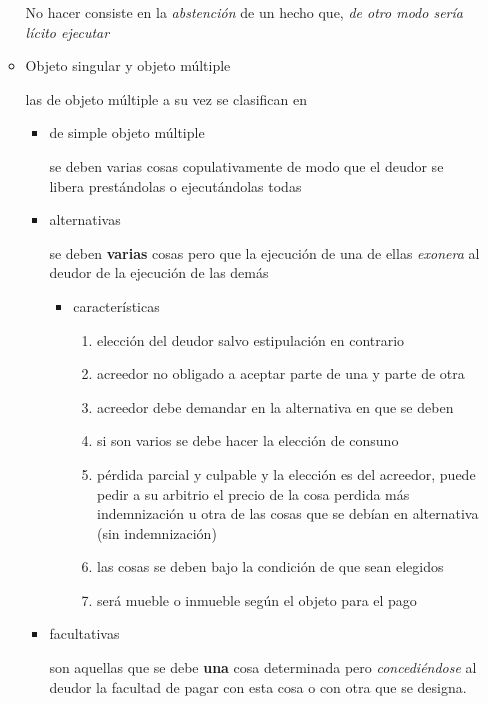 \documentclass[]{article}
\providecommand{\tightlist}{%
  \setlength{\itemsep}{0pt}\setlength{\parskip}{0pt}}
\begin{document}
\begin{itemize}
\begin{itemize}
    No hacer consiste en la \emph{abstención} de un hecho que, \emph{de
    otro modo sería lícito ejecutar}
  \item
    Objeto singular y objeto múltiple

    las de objeto múltiple a su vez se clasifican en

    \begin{itemize}
    \item
      de simple objeto múltiple

      se deben varias cosas copulativamente de modo que el deudor se
      libera prestándolas o ejecutándolas todas
    \item
      alternativas

      se deben \textbf{varias} cosas pero que la ejecución de una de
      ellas \emph{exonera} al deudor de la ejecución de las demás

      \begin{itemize}
      \tightlist
      \item
        características

        \begin{enumerate}
        \def\labelenumi{\arabic{enumi}.}
        \tightlist
        \item
          elección del deudor salvo estipulación en contrario
        \item
          acreedor no obligado a aceptar parte de una y parte de otra
        \item
          acreedor debe demandar en la alternativa en que se deben
        \item
          si son varios se debe hacer la elección de consuno
        \item
          pérdida parcial y culpable y la elección es del acreedor,
          puede pedir a su arbitrio el precio de la cosa perdida más
          indemnización u otra de las cosas que se debían en alternativa
          (sin indemnización)
        \item
          las cosas se deben bajo la condición de que sean elegidos
        \item
          será mueble o inmueble según el objeto para el pago
        \end{enumerate}
      \end{itemize}
    \item
      facultativas

      son aquellas que se debe \textbf{una} cosa determinada pero
      \emph{concediéndose} al deudor la facultad de pagar con esta cosa
      o con otra que se designa.


\end{itemize}
\end{itemize}
\end{itemize}
\end{document}
